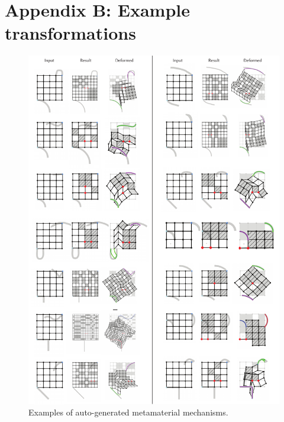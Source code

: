 
\section{Appendix B: Example transformations}
\label{appendix:example-transformations}
\begin{figure} [h!]
    \includegraphics[width=\textwidth]{chapters/understanding-metamaterial-mechanisms-FIG/21-optimization-results.pdf}
    \caption[Short figure name.]{Examples of auto-generated metamaterial mechanisms.
    \label{fig:21-optimization-results}}
\end{figure}


